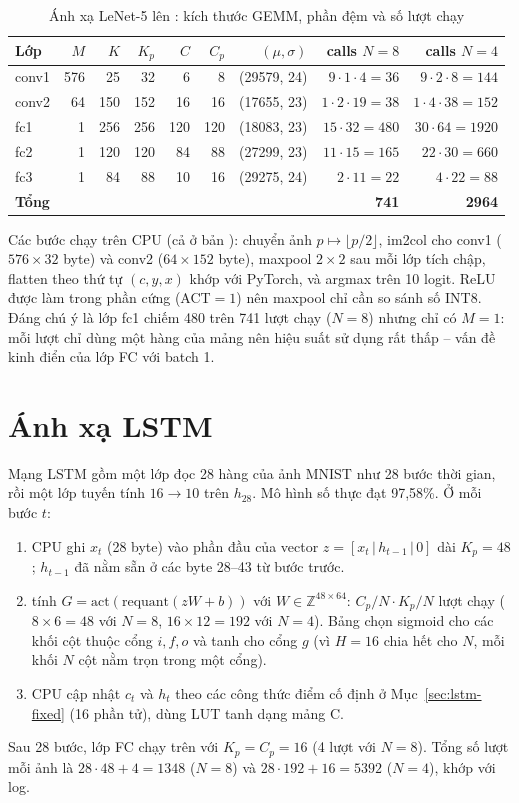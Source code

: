 \begin{table}[H]
  \centering
  \caption{Ánh xạ LeNet-5 lên \NPU{}: kích thước GEMM, phần đệm và số lượt chạy}
  \label{tab:lenet-map}
  \begin{tabular}{lrrrrrrrr}
    \toprule
    Lớp & $M$ & $K$ & $K_p$ & $C$ & $C_p$ & $(\mu,\sigma)$ & calls $N{=}8$ & calls $N{=}4$\\
    \midrule
    conv1 & 576 & 25 & 32 & 6 & 8 & (29579, 24) & $9\cdot1\cdot4=36$ & $9\cdot2\cdot8=144$\\
    conv2 & 64 & 150 & 152 & 16 & 16 & (17655, 23) & $1\cdot2\cdot19=38$ & $1\cdot4\cdot38=152$\\
    fc1 & 1 & 256 & 256 & 120 & 120 & (18083, 23) & $15\cdot32=480$ & $30\cdot64=1920$\\
    fc2 & 1 & 120 & 120 & 84 & 88 & (27299, 23) & $11\cdot15=165$ & $22\cdot30=660$\\
    fc3 & 1 & 84 & 88 & 10 & 16 & (29275, 24) & $2\cdot11=22$ & $4\cdot22=88$\\
    \midrule
    \textbf{Tổng} & & & & & & & \textbf{741} & \textbf{2964}\\
    \bottomrule
  \end{tabular}
\end{table}

Các bước chạy trên CPU (cả ở bản \NPU{}): chuyển ảnh $p\mapsto \lfloor p/2\rfloor$, im2col cho conv1 ($576\times32$ byte) và conv2 ($64\times152$ byte), maxpool $2\times2$ sau mỗi lớp tích chập, flatten theo thứ tự $(c,y,x)$ khớp với PyTorch, và argmax trên 10 logit. ReLU được làm trong phần cứng (ACT$=1$) nên maxpool chỉ cần so sánh số INT8. Đáng chú ý là lớp fc1 chiếm 480 trên 741 lượt chạy ($N=8$) nhưng chỉ có $M=1$: mỗi lượt chỉ dùng một hàng của mảng nên hiệu suất sử dụng rất thấp -- vấn đề kinh điển của lớp FC với batch 1.

\section{Ánh xạ LSTM}
\label{sec:lstm-map}
Mạng LSTM gồm một lớp  đọc 28 hàng của ảnh MNIST như 28 bước thời gian, rồi một lớp tuyến tính $16\to10$ trên $h_{28}$. Mô hình số thực đạt 97,58\%. Ở mỗi bước $t$:
\begin{enumerate}
  \item CPU ghi $x_t$ (28 byte) vào phần đầu của vector $z=[x_t\,|\,h_{t-1}\,|\,0]$ dài $K_p=48$; $h_{t-1}$ đã nằm sẵn ở các byte 28--43 từ bước trước.
  \item \NPU{} tính $G=\text{act}(\text{requant}(zW+b))$ với $W\in\mathbb{Z}^{48\times64}$: $C_p/N\cdot K_p/N$ lượt chạy ($8\times6=48$ với $N=8$, $16\times12=192$ với $N=4$). Bảng  chọn sigmoid cho các khối cột thuộc cổng $i,f,o$ và tanh cho cổng $g$ (vì $H=16$ chia hết cho $N$, mỗi khối $N$ cột nằm trọn trong một cổng).
  \item CPU cập nhật $c_t$ và $h_t$ theo các công thức điểm cố định ở Mục~\ref{sec:lstm-fixed} (16 phần tử), dùng LUT tanh dạng mảng C.
\end{enumerate}
Sau 28 bước, lớp FC chạy trên \NPU{} với $K_p=C_p=16$ (4 lượt với $N=8$). Tổng số lượt mỗi ảnh là $28\cdot48+4=1348$ ($N=8$) và $28\cdot192+16=5392$ ($N=4$), khớp với log.

